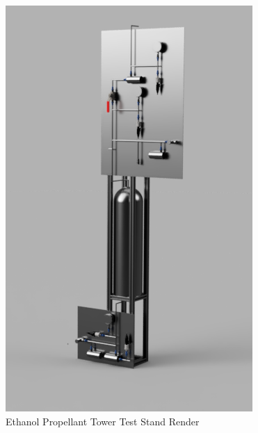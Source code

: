 \documentclass[9pt]{article} %
\numberwithin{equation}{section} %
\begin{document}
\begin{figure}[!htb] 
    \centering
    \includegraphics[scale=0.5]{ethanol_stand.png} %
    \caption{Ethanol Propellant Tower Test Stand Render}
    \label{fig:ethanol_tank_stand_render}
\end{figure}
\end{document}

